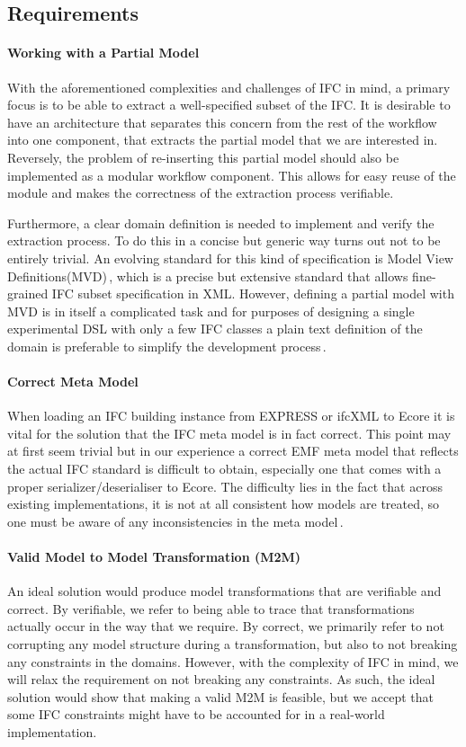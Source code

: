 \subsection{Requirements}
\paragraph{Working with a Partial Model}
With the aforementioned complexities and challenges of IFC in mind, a primary focus is to be able to extract a well-specified subset of the IFC. It is desirable to have an architecture that separates this concern from the rest of the workflow into one component, that extracts the partial model that we are interested in. Reversely, the problem of re-inserting this partial model should also be implemented as a modular workflow component. This allows for easy reuse of the module and makes the correctness of the extraction process verifiable.

Furthermore, a clear domain definition is needed to implement and verify the extraction process. To do this in a concise but generic way turns out not to be entirely trivial. An evolving standard for this kind of specification is Model View Definitions(MVD)\,\cite{nour08}, which is a precise but extensive standard that allows fine-grained IFC subset specification in XML. However, defining a partial model with MVD is in itself a complicated task and for purposes of designing a single experimental DSL with only a few IFC classes a plain text definition of the domain is preferable to simplify the development process\,\cite{mvd}.

\paragraph{Correct Meta Model}
When loading an IFC building instance from EXPRESS or ifcXML to Ecore it is vital for the solution that the IFC meta model is in fact correct. This point may at first seem trivial but in our experience a correct EMF meta model that reflects the actual IFC standard is difficult to obtain, especially one that comes with a proper serializer/deserialiser to Ecore. The difficulty lies in the fact that across existing implementations, it is not at all consistent how models are treated, so one must be aware of any inconsistencies in the meta model\,\cite[pp. 4]{quteprints37725}. %

\paragraph{Valid Model to Model Transformation (M2M)}
An ideal solution would produce model transformations that are verifiable and correct. By verifiable, we refer to being able to trace that transformations actually occur in the way that we require. By correct, we primarily refer to not corrupting any model structure during a transformation, but also to not breaking any constraints in the domains. However, with the complexity of IFC in mind, we will relax the requirement on not breaking any constraints. As such, the ideal solution would show that making a valid M2M is feasible, but we accept that some IFC constraints might have to be accounted for in a real-world implementation.

